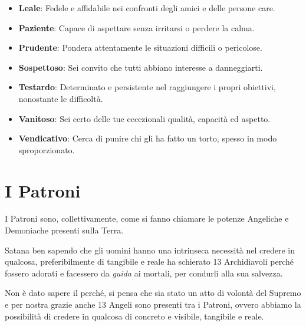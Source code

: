 \documentclass[a4paper,twoside,openany]{book}
\begin{document}
\begin{multicols}{2}
\begin{itemize}[leftmargin=*]
		\item \textbf{Leale}: Fedele e affidabile nei confronti degli amici e delle persone care.
		\item \textbf{Paziente}: Capace di aspettare senza irritarsi o perdere la calma.
		\item \textbf{Prudente}: Pondera attentamente le situazioni difficili o pericolose.
		\item \textbf{Sospettoso}: Sei convito che tutti abbiano interesse a danneggiarti.
		\item \textbf{Testardo}: Determinato e persistente nel raggiungere i propri obiettivi, nonostante le difficoltà.
		\item \textbf{Vanitoso}: Sei certo delle tue eccezionali qualità, capacità ed aspetto.
		\item \textbf{Vendicativo}: Cerca di punire chi gli ha fatto un torto, spesso in modo sproporzionato.

	\end{itemize}

	\medskip


\section{I Patroni}

I Patroni sono, collettivamente, come si fanno chiamare le potenze Angeliche e Demoniache presenti sulla Terra.

Satana ben sapendo che gli uomini hanno una intrinseca necessità nel credere in qualcosa, preferibilmente di tangibile e reale ha schierato 13 Archidiavoli perché fossero adorati e facessero da \emph{guida} ai mortali, per condurli alla sua salvezza.

Non è dato sapere il perché, si pensa che sia stato un atto di volontà del Supremo e per nostra grazie anche 13 Angeli sono presenti tra i Patroni, ovvero abbiamo la possibilità di credere in qualcosa di concreto e visibile, tangibile e reale.


\end{multicols}
\end{document}
